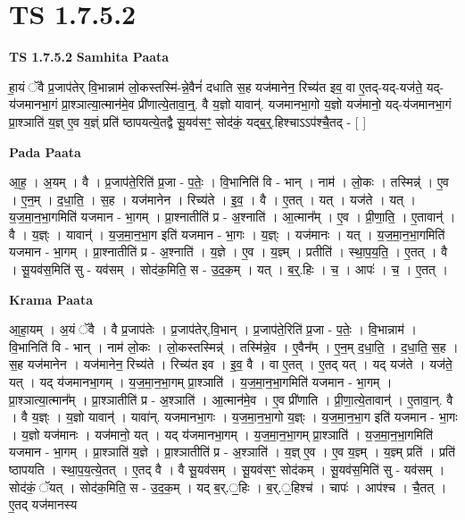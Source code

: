 \documentclass[17pt]{extarticle}
\begin{document}
\section{ TS 1.7.5.2 }

\textbf{TS 1.7.5.2 } \newline
\textbf{Samhita Paata} \newline

हा॒यं ॅवै प्र॒जाप॑तेर् वि॒भान्नाम॑ लो॒कस्तस्मि॑-न्ने॒वैनं॑ दधाति स॒ह यज॑मानेन॒ रिच्य॑त इव॒ वा ए॒तद्-यद्-यज॑ते॒ यद्-य॑जमानभा॒गं प्रा॒श्ञात्या॒त्मान॑मे॒व प्री॑णात्ये॒तावा॒न्॒. वै य॒ज्ञो यावान्॑. यजमानभा॒गो य॒ज्ञो यज॑मानो॒ यद्-य॑जमानभा॒गं प्रा॒श्ञाति॑ य॒ज्ञ् ए॒व य॒ज्ञ्ं प्रति॑ ष्ठापयत्ये॒तद्वै सू॒यव॑सꣳ॒॒ सोद॑कं॒ यद्ब॒र्॒.हिश्चाऽऽप॑श्चै॒तद् - [ ] \newline

\textbf{Pada Paata} \newline

आ॒ह॒ । अ॒यम् । वै । प्र॒जाप॑ते॒रिति॑ प्र॒जा - प॒तेः॒ । वि॒भानिति॑ वि - भान् । नाम॑ । लो॒कः । तस्मिन्न्॑ । ए॒व । ए॒न॒म् । द॒धा॒ति॒ । स॒ह । यज॑मानेन । रिच्य॑ते । इ॒व॒ । वै । ए॒तत् । यत् । यज॑ते । यत् । य॒ज॒मा॒न॒भा॒गमिति॑ यजमान - भा॒गम् । प्रा॒श्नातीति॑ प्र - अ॒श्नाति॑ । आ॒त्मान᳚म् । ए॒व । प्री॒णा॒ति॒ । ए॒तावान्॑ । वै । य॒ज्ञ्ः । यावान्॑ । य॒ज॒मा॒न॒भा॒ग इति॑ यजमान - भा॒गः । य॒ज्ञ्ः । यज॑मानः । यत् । य॒ज॒मा॒न॒भा॒गमिति॑ यजमान - भा॒गम् । प्रा॒श्नातीति॑ प्र - अ॒श्नाति॑ । य॒ज्ञे । ए॒व । य॒ज्ञ्म् । प्रतीति॑ । स्था॒प॒य॒ति॒ । ए॒तत् । वै । सू॒यव॑स॒मिति॑ सु - यव॑सम् । सोद॑क॒मिति॒ स - उ॒द॒क॒म् । यत् । ब॒र्॒.हिः । च॒ । आपः॑ । च॒ । ए॒तत् ।  \newline


\textbf{Krama Paata} \newline

आ॒हा॒यम् । अ॒यं ॅवै । वै प्र॒जाप॑तेः । प्र॒जाप॑तेर्,वि॒भान् । प्र॒जाप॑ते॒रिति॑ प्र॒जा - प॒तेः॒ । वि॒भान्नाम॑ । वि॒भानिति॑ वि - भान् । नाम॑ लो॒कः । लो॒कस्तस्मिन्न्॑ । तस्मि॑न्ने॒व । ए॒वैन᳚म् । ए॒न॒म् द॒धा॒ति॒ । द॒धा॒ति॒ स॒ह । स॒ह यज॑मानेन । यज॑मानेन॒ रिच्य॑ते । रिच्य॑त इव । इ॒व॒ वै । वा ए॒तत् । ए॒तद् यत् । यद् यज॑ते । यज॑ते॒ यत् । 
यद् य॑जमानभा॒गम् । य॒ज॒मा॒न॒भा॒गम् प्रा॒श्ञाति॑ । य॒ज॒मा॒न॒भा॒गमिति॑ यजमान - भा॒गम् । प्रा॒श्ञात्या॒त्मान᳚म् । प्रा॒श्ञातीति॑ प्र - अ॒श्ञाति॑ । आ॒त्मान॑मे॒व । ए॒व प्री॑णाति । प्री॒णा॒त्ये॒तावान्॑ । ए॒तावा॒न्. वै । वै य॒ज्ञ्ः । य॒ज्ञो यावान्॑ । यावा॑न्. यजमानभा॒गः । य॒ज॒मा॒न॒भा॒गो य॒ज्ञ्ः । य॒ज॒मा॒न॒भा॒ग इति॑ यजमान - भा॒गः । य॒ज्ञो यज॑मानः । यज॑मानो॒ यत् । यद् य॑जमानभा॒गम् । य॒ज॒मा॒न॒भा॒गम् प्रा॒श्ञाति॑ । य॒ज॒मा॒न॒भा॒गमिति॑ यजमान - भा॒गम् । प्रा॒श्ञाति॑ य॒ज्ञे । प्रा॒श्ञातीति॑ प्र - अ॒श्ञाति॑ । य॒ज्ञ् ए॒व । ए॒व य॒ज्ञ्म् । य॒ज्ञ्म् प्रति॑ । प्रति॑ ष्ठापयति । स्था॒प॒य॒त्ये॒तत् । ए॒तद् वै । वै सू॒यव॑सम् । सू॒यव॑सꣳ॒॒ सोद॑कम् । सू॒यव॑स॒मिति॑ सु - यव॑सम् । सोद॑कं॒ ॅयत् । सोद॑क॒मिति॒ स - उ॒द॒क॒म् । यद् ब॒र्.॒॒॒हिः । ब॒र्.॒॒॒हिश्च॑ । चापः॑ । आप॑श्च । चै॒तत् । 
ए॒तद् यज॑मानस्य \newline
\end{document}
